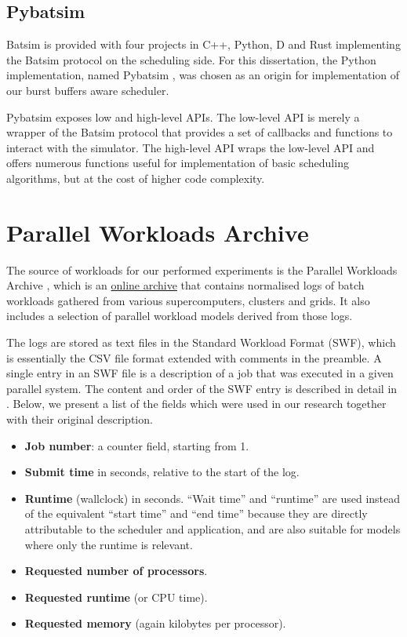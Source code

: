 \documentclass[thesis-en.tex]{subfiles}
\begin{document}
\subsection{Pybatsim}
Batsim is provided with four projects in C++, Python, D and Rust implementing the Batsim protocol on the scheduling side. For this dissertation, the Python implementation, named Pybatsim \cite{pybatsim-repo}, was chosen as an origin for implementation of our burst buffers aware scheduler.

Pybatsim exposes low and high-level APIs. The low-level API is merely a wrapper of the Batsim protocol that provides a set of callbacks and functions to interact with the simulator. The high-level API wraps the low-level API and offers numerous functions useful for implementation of basic scheduling algorithms, but at the cost of higher code complexity.

\section{Parallel Workloads Archive} \label{sec:archive}
The source of workloads for our performed experiments is the Parallel Workloads Archive \cite{FEITELSON20142967, parallel-workload-archive}, which is an \href{https://www.cs.huji.ac.il/labs/parallel/workload/}{online archive} that contains normalised logs of batch workloads gathered from various supercomputers, clusters and grids. It also includes a selection of parallel workload models derived from those logs.

The logs are stored as text files in the Standard Workload Format (SWF), which is essentially the CSV file format extended with comments in the preamble. A single entry in an SWF file is a description of a job that was executed in a given parallel system. The content and order of the SWF entry is described in detail in \cite{10.5555/2808941}. Below, we present a list of the fields which were used in our research together with their original description.
\medskip
\begin{itemize}
\item \textbf{Job number}: a counter field, starting from 1.
\item \textbf{Submit time} in seconds, relative to the start of the log.
\item \textbf{Runtime} (wallclock) in seconds. “Wait time” and “runtime” are used instead of the equivalent “start time” and “end time” because they are directly attributable to the scheduler and application, and are also suitable for models where only the runtime is relevant.
\item \textbf{Requested number of processors}.
\item \textbf{Requested runtime} (or CPU time).
\item \textbf{Requested memory} (again kilobytes per processor).
\end{itemize}
\end{document}

